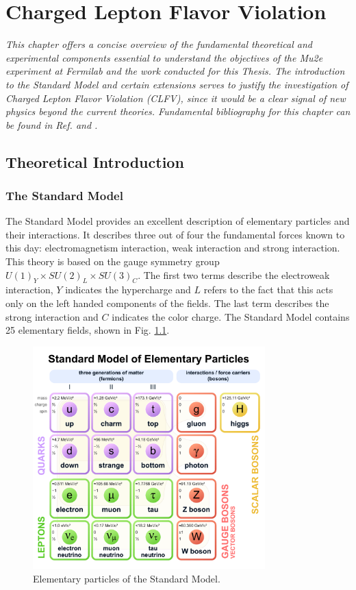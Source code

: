 \chapter{Charged Lepton Flavor Violation}
\textit{This chapter offers a concise overview of the fundamental theoretical and experimental components essential to understand the objectives of the Mu2e experiment at Fermilab and the work conducted for this Thesis. The introduction to the Standard Model and certain extensions serves to justify the investigation of Charged Lepton Flavor Violation (CLFV), since it would be a clear signal of new physics beyond the current theories. Fundamental bibliography for this chapter can be found in Ref. \cite{Bernstein_2013} and \cite{clfv_signorelli}.}
\section{Theoretical Introduction}
\subsection{The Standard Model}
The Standard Model provides an excellent description of elementary particles and their interactions. It describes three out of four the fundamental forces known to this day: electromagnetism interaction, weak interaction and strong interaction. This theory is based on the gauge symmetry group $U(1)_Y \times SU(2)_L \times SU(3)_C$. The first two terms describe the electroweak interaction, $Y$ indicates the hypercharge and $L$ refers to the fact that this acts only on the left handed components of the fields. The last term describes the strong interaction and $C$ indicates the color charge.
The Standard Model contains 25 elementary fields, shown in Fig. \ref{fig:sm}.

\begin{figure}[!h]
\centering
\includegraphics[width =0.8\textwidth]{figures/pdf/Standard_Model_of_Elementary_Particles.pdf}
\caption{Elementary particles of the Standard Model.}
\label{fig:sm}
\end{figure}


